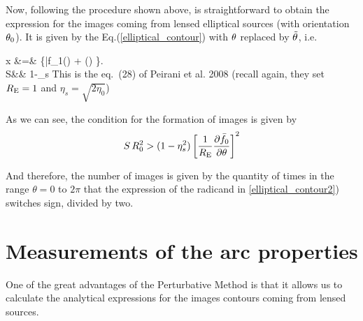 Now, following the procedure shown above, is straightforward to obtain the expression for the images coming from
lensed elliptical sources (with orientation $\theta_0$).  It is given by the Eq.(\ref{elliptical_contour}) with $\theta$ replaced by $\tilde{\theta}$, i.e.

\bea
\label{eq:ellipsource}
x &=&  \left\{\bar{f}_{1}(\theta) +%
\left(\right) \pm {}  \right\}.\label{elliptical_contour2}\\
S&\equiv& 1-\eta_s\cos{(2\tilde{\te})}\nonumber
\eea
This is the eq.~(28) of Peirani et al. 2008 (recall again, they set $R_{\mathrm{E}}=1$ and $\eta_s=\sqrt{2\eta_0}$)


As we can see, the condition for the formation of images is given by
\begin{equation*}
S\,R^2_0>(1-\eta^2_s)\left[\frac{1}{R_{\mathrm{E}}}\dfrac{\partial \bar{f}_0}{\partial \theta}\right]^2
\end{equation*}

And therefore, the number of images is given by the quantity of times
in the range $\theta = 0 $ to $2 \pi$ that the expression of the
radicand in \eqref{elliptical_contour2}) switches sign, divided by
two.


\section{Measurements of the arc properties}

One of the great advantages of the Perturbative Method is that it
allows us to calculate the analytical expressions for the images contours
coming from lensed sources.

